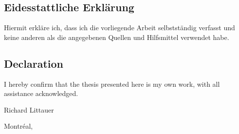 \documentclass[12pt,a4paper]{article}
\begin{document}


\newpage

\thispagestyle{empty}
\noindent\subsection*{Eidesstattliche Erkl\"arung}

\noindent Hiermit erkl\"are ich, dass ich die vorliegende Arbeit selbstst\"andig verfasst und keine anderen als die angegebenen Quellen und Hilfsmittel verwendet habe.\\

\noindent\subsection*{Declaration}

\noindent I hereby confirm that the thesis presented here is my own work, with all assistance acknowledged. \\

\vspace{1cm}

\noindent Richard Littauer

\vspace{.5cm}

\noindent Montr\'eal, \thedate



\newpage



\newpage

%
\tableofcontents
\thispagestyle{empty}

\newpage
\thispagestyle{empty}
\setcounter{page}{0}
\listoffigures
\setcounter{page}{0}
\listoftables
\thispagestyle{empty}
\newpage

\setcounter{page}{1}

\end{document}

